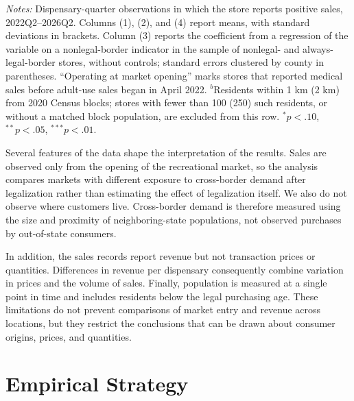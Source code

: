 \documentclass[english,12pt]{article}
\begin{document}
\begin{table}[htbp]
\centering\footnotesize
\caption{Summary statistics, New Mexico dispensary panel}
\label{tab:sumstats_disp}

\begin{minipage}{0.97\textwidth}
\vspace{0.4em}\footnotesize
\textit{Notes:} Dispensary-quarter observations in which the store reports positive sales, 2022Q2--2026Q2. Columns (1), (2), and (4) report means, with standard deviations in brackets. Column (3) reports the coefficient from a regression of the variable on a nonlegal-border indicator in the sample of nonlegal- and always-legal-border stores, without controls; standard errors clustered by county in parentheses. ``Operating at market opening'' marks stores that reported medical sales before adult-use sales began in April 2022. $^{b}$Residents within 1 km (2 km) from 2020 Census blocks; stores with fewer than 100 (250) such residents, or without a matched block population, are excluded from this row. $^{*}p<.10$, $^{**}p<.05$, $^{***}p<.01$.
\end{minipage}
\end{table}


Several features of the data shape the interpretation of the results. Sales are observed only from the opening of the recreational market, so the analysis compares markets with different exposure to cross-border demand after legalization rather than estimating the effect of legalization itself. We also do not observe where customers live. Cross-border demand is therefore measured using the size and proximity of neighboring-state populations, not observed purchases by out-of-state consumers.

In addition, the sales records report revenue but not transaction prices or quantities. Differences in revenue per dispensary consequently combine variation in prices and the volume of sales. Finally, population is measured at a single point in time and includes residents below the legal purchasing age. These limitations do not prevent comparisons of market entry and revenue across locations, but they restrict the conclusions that can be drawn about consumer origins, prices, and quantities.



\section{Empirical Strategy}
\label{sec:empirical}
\end{document}
